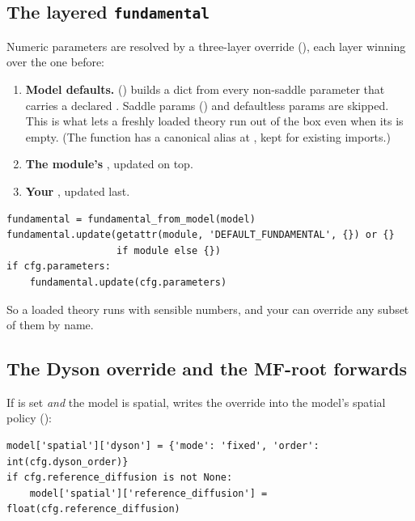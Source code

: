 \subsection{The layered \texttt{fundamental}}\label{sec:layered}

Numeric parameters are resolved by a three-layer override
(), each layer winning over the one before:

\begin{enumerate}
  \item \textbf{Model defaults.} 
        () builds a dict from every non-saddle
        parameter that carries a declared . Saddle params
        () and defaultless params are skipped. This is what lets a
        freshly loaded theory run out of the box even when its
         is empty. (The function has a canonical alias
         at , kept
        for existing imports.)
  \item \textbf{The module's }, updated on top.
  \item \textbf{Your }, updated last.
\end{enumerate}

\begin{lstlisting}
fundamental = fundamental_from_model(model)
fundamental.update(getattr(module, 'DEFAULT_FUNDAMENTAL', {}) or {}
                   if module else {})
if cfg.parameters:
    fundamental.update(cfg.parameters)
\end{lstlisting}

So a loaded theory runs with sensible numbers, and your  can
override any subset of them by name.

\subsection{The Dyson override and the MF-root forwards}

If  is set \emph{and} the model is spatial, 
writes the override into the model's spatial policy
():

\begin{lstlisting}
model['spatial']['dyson'] = {'mode': 'fixed', 'order': int(cfg.dyson_order)}
if cfg.reference_diffusion is not None:
    model['spatial']['reference_diffusion'] = float(cfg.reference_diffusion)
\end{lstlisting}

